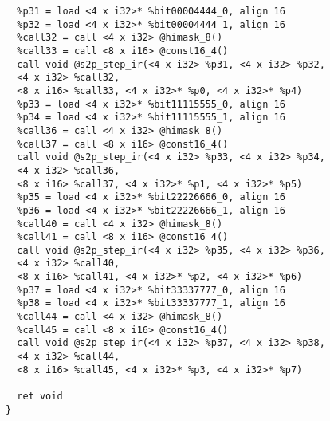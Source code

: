 \begin{lstlisting}
  %p31 = load <4 x i32>* %bit00004444_0, align 16
  %p32 = load <4 x i32>* %bit00004444_1, align 16
  %call32 = call <4 x i32> @himask_8()
  %call33 = call <8 x i16> @const16_4()
  call void @s2p_step_ir(<4 x i32> %p31, <4 x i32> %p32,
  <4 x i32> %call32,
  <8 x i16> %call33, <4 x i32>* %p0, <4 x i32>* %p4)
  %p33 = load <4 x i32>* %bit11115555_0, align 16
  %p34 = load <4 x i32>* %bit11115555_1, align 16
  %call36 = call <4 x i32> @himask_8()
  %call37 = call <8 x i16> @const16_4()
  call void @s2p_step_ir(<4 x i32> %p33, <4 x i32> %p34,
  <4 x i32> %call36,
  <8 x i16> %call37, <4 x i32>* %p1, <4 x i32>* %p5)
  %p35 = load <4 x i32>* %bit22226666_0, align 16
  %p36 = load <4 x i32>* %bit22226666_1, align 16
  %call40 = call <4 x i32> @himask_8()
  %call41 = call <8 x i16> @const16_4()
  call void @s2p_step_ir(<4 x i32> %p35, <4 x i32> %p36,
  <4 x i32> %call40,
  <8 x i16> %call41, <4 x i32>* %p2, <4 x i32>* %p6)
  %p37 = load <4 x i32>* %bit33337777_0, align 16
  %p38 = load <4 x i32>* %bit33337777_1, align 16
  %call44 = call <4 x i32> @himask_8()
  %call45 = call <8 x i16> @const16_4()
  call void @s2p_step_ir(<4 x i32> %p37, <4 x i32> %p38,
  <4 x i32> %call44,
  <8 x i16> %call45, <4 x i32>* %p3, <4 x i32>* %p7)

  ret void
}

\end{lstlisting}

